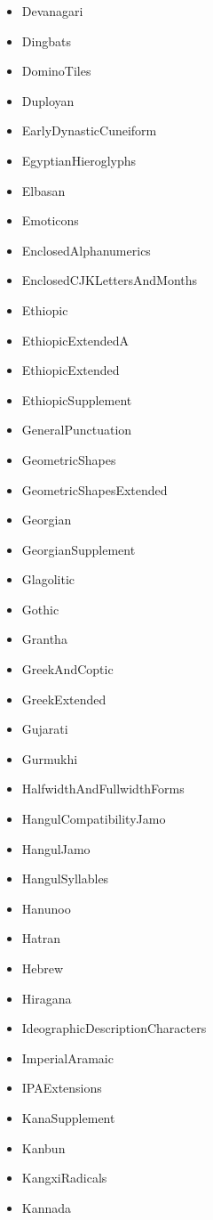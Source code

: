 ﻿\documentclass{article}
\newenvironment{itemlist}{%
  \begin{itemize}
	\setlength{\itemsep}{0pt}
	\setlength{\parsep}{0pt}
	\setlength{\topsep}{0pt}
	\setlength{\partopsep}{0pt}
	\setlength{\parskip}{0pt}
	\setlength{\labelsep}{5pt}}%
{
  \end{itemize}}
\begin{document}
\begin{multicols}{2}
\begin{itemlist}
				\item Devanagari
				\item Dingbats
				\item DominoTiles
				\item Duployan
				\item EarlyDynasticCuneiform
				\item EgyptianHieroglyphs
				\item Elbasan
				\item Emoticons
				\item EnclosedAlphanumerics
				\item EnclosedCJKLettersAndMonths
				\item Ethiopic
				\item EthiopicExtendedA
				\item EthiopicExtended
				\item EthiopicSupplement
				\item GeneralPunctuation
				\item GeometricShapes
				\item GeometricShapesExtended
				\item Georgian
				\item GeorgianSupplement
				\item Glagolitic
				\item Gothic
				\item Grantha
				\item GreekAndCoptic
				\item GreekExtended
				\item Gujarati
				\item Gurmukhi
				\item HalfwidthAndFullwidthForms
				\item HangulCompatibilityJamo
				\item HangulJamo
				\item HangulSyllables
				\item Hanunoo
				\item Hatran
				\item Hebrew
				\item Hiragana
				\item IdeographicDescriptionCharacters
				\item ImperialAramaic
				\item IPAExtensions
				\item KanaSupplement
				\item Kanbun
				\item KangxiRadicals
				\item Kannada

\end{itemlist}
\end{multicols}
\end{document}
